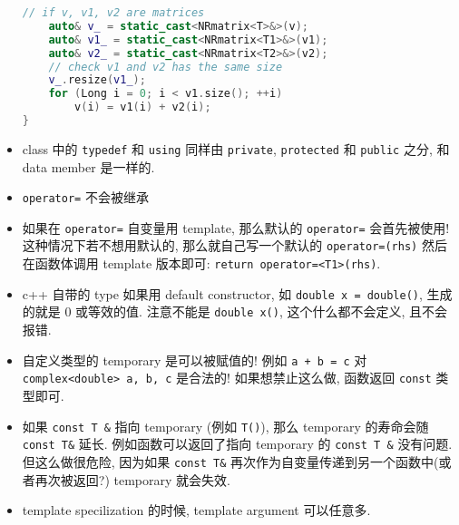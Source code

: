 \begin{itemize}
\begin{lstlisting}[language=cpp]
	// if v, v1, v2 are matrices
	auto& v_ = static_cast<NRmatrix<T>&>(v);
	auto& v1_ = static_cast<NRmatrix<T1>&>(v1);
	auto& v2_ = static_cast<NRmatrix<T2>&>(v2);
	// check v1 and v2 has the same size
	v_.resize(v1_);
	for (Long i = 0; i < v1.size(); ++i)
		v(i) = v1(i) + v2(i);
}
\end{lstlisting}

\item class 中的 \verb`typedef` 和 \verb`using` 同样由 \verb`private`, \verb`protected` 和 \verb`public` 之分, 和 data member 是一样的.
\item \verb`operator=` 不会被继承
\item 如果在 \verb`operator=` 自变量用 template, 那么默认的 \verb`operator=` 会首先被使用! 这种情况下若不想用默认的, 那么就自己写一个默认的 \verb`operator=(rhs)` 然后在函数体调用 template 版本即可: \verb`return operator=<T1>(rhs)`.
\item c++ 自带的 type 如果用 default constructor, 如 \verb`double x = double()`, 生成的就是 0 或等效的值. 注意不能是 \verb`double x()`, 这个什么都不会定义, 且不会报错.
\item 自定义类型的 temporary 是可以被赋值的! 例如 \verb`a + b = c` 对 \verb`complex<double> a, b, c` 是合法的! 如果想禁止这么做, 函数返回 \verb`const` 类型即可.
\item 如果 \verb`const T &` 指向 temporary (例如 \verb`T()`), 那么 temporary 的寿命会随 \verb`const T&` 延长. 例如函数可以返回了指向 temporary 的 \verb`const T &` 没有问题. 但这么做很危险, 因为如果 \verb`const T&` 再次作为自变量传递到另一个函数中(或者再次被返回?) temporary 就会失效.
\item template specilization 的时候, template argument 可以任意多.
\end{itemize}
